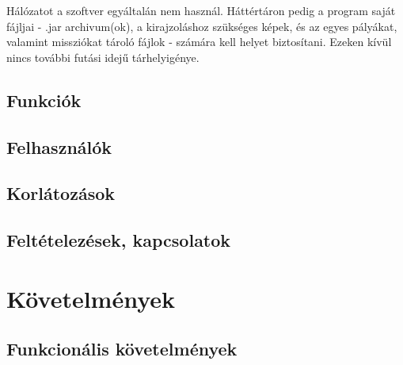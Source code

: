 Hálózatot a szoftver egyáltalán nem használ. Háttértáron pedig a program saját fájljai - .jar archivum(ok), a kirajzoláshoz szükséges képek, és az egyes pályákat, valamint missziókat tároló fájlok - számára kell helyet biztosítani. Ezeken kívül nincs további futási idejű tárhelyigénye.

\subsection{Funkciók}



\subsection{Felhasználók}

\subsection{Korlátozások}

\subsection{Feltételezések, kapcsolatok}

\section{Követelmények}
\subsection{Funkcionális követelmények}



